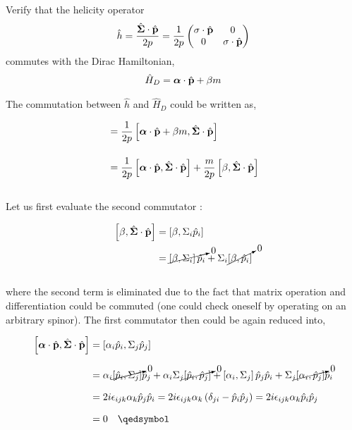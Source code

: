 \begin{problem}{4.12} \label{P4.12}
Verify that the helicity operator
\begin{align*}
    \hat{h} = \frac{\hat{\boldsymbol{\Sigma}}\cdot\hat{\mathbf{p}}}{2p} = \frac{1}{2p}
    \begin{pmatrix}
        \boldmath{\sigma}\cdot\hat{\mathbf{p}} & 0 \\
        0 & \boldmath{\sigma}\cdot\hat{\mathbf{p}}
    \end{pmatrix}
\end{align*}
commutes with the Dirac Hamiltonian,
\begin{align*}
    \hat{H}_D = \boldsymbol{\alpha}\cdot\hat{\mathbf{p}} + \beta m
\end{align*}
\end{problem}
\begin{solution}
The commutation between $\hat{h}$ and $\hat{H}_D$ could be written as,

\begin{align*}
    [ \hat{H}_D , \hat{h} ] &= \frac{1}{2p} \left[\boldsymbol{\alpha}\cdot\hat{\boldp} + \beta m,  \hat{\boldsymbol{\Sigma}}\cdot\hat{\boldp} \right] \\[0.15in]
                            &= \frac{1}{2p}   \left[ \boldsymbol{\alpha}\cdot\hat{\boldp} , \hat{\boldsymbol{\Sigma}}\cdot\hat{\boldp}   \right] + \frac{m}{2p} \left[\beta,\hat{\boldsymbol{\Sigma}}\cdot\hat{\boldp} \right] 
\end{align*}\\
Let us first evaluate the second commutator : 

\begin{align*}
    \left[\beta,\hat{\boldsymbol{\Sigma}}\cdot\hat{\mathbf{p}} \right] &= \left[\beta,\Sigma_i \hat{p}_i\right] \\
    &= \cancelto{0}{\left[\beta,\Sigma_i\right]\hat{p}_i} + \Sigma_i \cancelto{0}{\left[ \beta,\hat{p}_i \right]}
\end{align*}\\
where the second term is eliminated due to the fact that matrix operation and differentiation could be commuted (one could check oneself by operating on an arbitrary spinor). The first commutator then could be again reduced into,

\begin{align*}
    \left[ \boldsymbol{\alpha}\cdot\hat{\boldp} , \hat{\boldsymbol{\Sigma}}\cdot\hat{\boldp}   \right] &= \left[ \alpha_i\hat{p}_i , \Sigma_j \hat{p}_j \right] \\[0.1in]
    &= \alpha_i \cancelto{0}{\left[ \hatp_i,\Sigma_j \right]}\hatp_j + \alpha_i \Sigma_j \cancelto{0}{\left[ \hatp_i,\hatp_j \right]} + \left[\alpha_i,\Sigma_j\right]\hatp_j\hatp_i + \Sigma_j \cancelto{0}{\left[ \alpha_i,\hatp_j \right]} \hatp_i \\[0.1in]
    &=  2i \epsilon_{ijk}\alpha_k \hatp_j \hatp_i    = 2i\epsilon_{ijk}\alpha_k \left(\delta_{ji} - \hatp_i\hatp_j\right) = 2i \epsilon_{ijk}\alpha_k \hatp_i \hatp_j \\[0.1in]
    &= 0 \qed 
\end{align*}
\end{solution}

